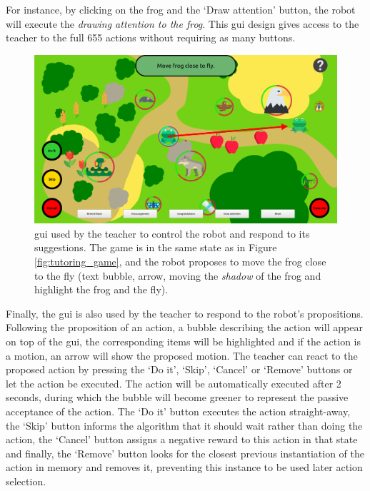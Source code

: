 For instance, by clicking on the frog and the `Draw attention' button, the robot will execute the \textit{drawing attention to the frog}. 
This \gls{gui} design gives access to the teacher to the full 655 actions without requiring as many buttons. %


\begin{figure}[ht]
	\centering
	\includegraphics[width=1\textwidth]{gui.png}
	\captionsetup{width=.9\linewidth}
	\caption{\gls{gui} used by the teacher to control the robot and respond to its suggestions. The game is in the same state as in Figure \ref{fig:tutoring_game}, and the robot proposes to move the frog close to the fly (text bubble, arrow, moving the \textit{shadow} of the frog and highlight the frog and the fly).}
	\label{fig:tutoring_gui}
\end{figure}


Finally, the \gls{gui} is also used by the teacher to respond to the robot's propositions. Following the proposition of an action, a bubble describing the action will appear on top of the \gls{gui}, the corresponding items will be highlighted and if the action is a motion, an arrow will show the proposed motion. The teacher can react to the proposed action by pressing the `Do it', `Skip', `Cancel' or `Remove' buttons or let the action be executed. The action will be automatically executed after 2 seconds, during which the bubble will become greener to represent the passive acceptance of the action. The `Do it' button executes the action straight-away, the `Skip' button informs the algorithm that it should wait rather than doing the action, the `Cancel' button assigns a negative reward to this action in that state and finally, the `Remove' button looks for the closest previous instantiation of the action in memory and removes it, preventing this instance to be used later action selection.

